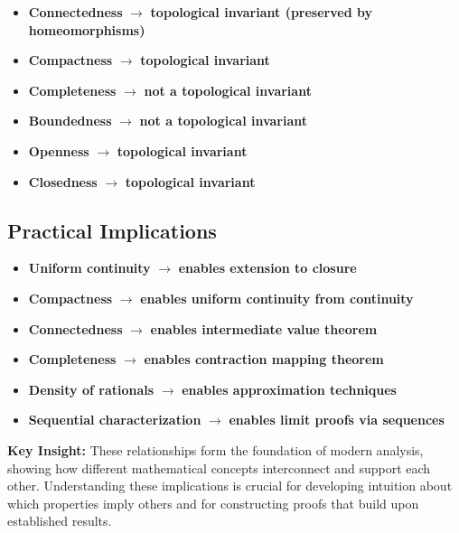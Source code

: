\begin{itemize}
\item \textbf{Connectedness} $\rightarrow$ \textbf{topological invariant (preserved by homeomorphisms)}
\item \textbf{Compactness} $\rightarrow$ \textbf{topological invariant}
\item \textbf{Completeness} $\rightarrow$ \textbf{not a topological invariant}
\item \textbf{Boundedness} $\rightarrow$ \textbf{not a topological invariant}
\item \textbf{Openness} $\rightarrow$ \textbf{topological invariant}
\item \textbf{Closedness} $\rightarrow$ \textbf{topological invariant}
\end{itemize}

\subsection*{Practical Implications}

\begin{itemize}
\item \textbf{Uniform continuity} $\rightarrow$ \textbf{enables extension to closure}
\item \textbf{Compactness} $\rightarrow$ \textbf{enables uniform continuity from continuity}
\item \textbf{Connectedness} $\rightarrow$ \textbf{enables intermediate value theorem}
\item \textbf{Completeness} $\rightarrow$ \textbf{enables contraction mapping theorem}
\item \textbf{Density of rationals} $\rightarrow$ \textbf{enables approximation techniques}
\item \textbf{Sequential characterization} $\rightarrow$ \textbf{enables limit proofs via sequences}
\end{itemize}

\medskip

\noindent\textbf{Key Insight:} These relationships form the foundation of modern analysis, showing how different mathematical concepts interconnect and support each other. Understanding these implications is crucial for developing intuition about which properties imply others and for constructing proofs that build upon established results.
